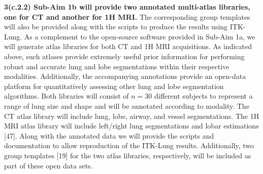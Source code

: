 \documentclass[11pt,]{article}
\begin{document}
\textbf{3(c.2.2) Sub-Aim 1b will provide two annotated multi-atlas
libraries, one for CT and another for 1H MRI.} The corresponding group
templates will also be provided along with the scripts to produce the
results using ITK-Lung. As a complement to the open-source software
provided in Sub-Aim 1a, we will generate atlas libraries for both CT and
1H MRI acquisitions. As indicated above, such atlases provide extremely
useful prior information for performing robust and accurate lung and
lobe segmentations within their respective modalities. Additionally, the
accompanying annotations provide an open-data platform for
quantitatively assessing other lung and lobe segmentation algorithms.
Both libraries will consist of \(n=30\) different subjects to represent
a range of lung size and shape and will be annotated according to
modality. The CT atlas library will include lung, lobe, airway, and
vessel segmentations. The 1H MRI atlas library will include left/right
lung segmentations and lobar estimations {[}47{]}. Along with the
annotated data we will provide the scripts and documentation to allow
reproduction of the ITK-Lung results. Additionally, two group templates
{[}19{]} for the two atlas libraries, respectively, will be included as
part of these open data sets.
\end{document}

